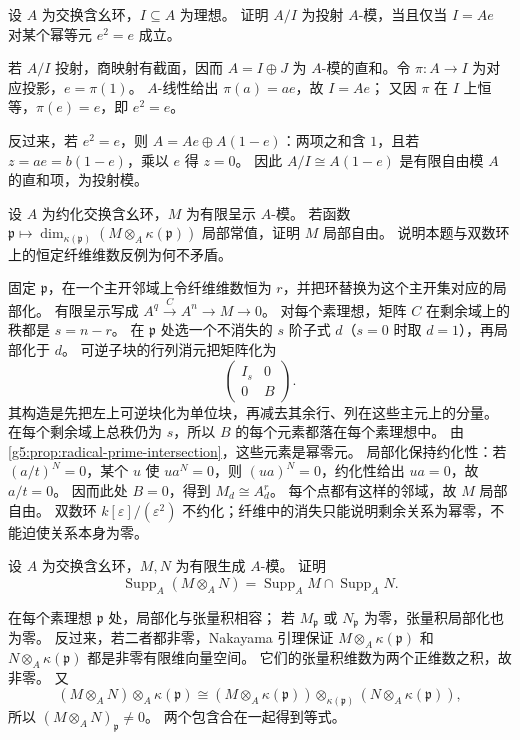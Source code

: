 \begin{exercise}\label{g5:ex:projective-cyclic-idempotent}
	设 \(A\) 为交换含幺环，\(I\subseteq A\) 为理想。 证明 \(A/I\) 为投射 \(A\)-模，当且仅当 \(I=Ae\) 对某个幂等元 \(e^2=e\) 成立。
\end{exercise}
\begin{solution}
	若 \(A/I\) 投射，商映射有截面，因而 \(A=I\oplus J\) 为 \(A\)-模的直和。令 \(\pi:A\to I\) 为对应投影，\(e=\pi(1)\)。 \(A\)-线性给出 \(\pi(a)=ae\)，故 \(I=Ae\)； 又因 \(\pi\) 在 \(I\) 上恒等，\(\pi(e)=e\)，即 \(e^2=e\)。

	反过来，若 \(e^2=e\)，则 \(A=Ae\oplus A(1-e)\)：两项之和含 \(1\)，且若 \(z=ae=b(1-e)\)，乘以 \(e\) 得 \(z=0\)。 因此 \(A/I\cong A(1-e)\) 是有限自由模 \(A\) 的直和项，为投射模。
\end{solution}

\begin{exercise}\label{g5:ex:reduced-constant-fibre}
	设 \(A\) 为约化交换含幺环，\(M\) 为有限呈示 \(A\)-模。 若函数 \(\mathfrak p\mapsto\dim_{\kappa(\mathfrak p)} (M\otimes_A\kappa(\mathfrak p))\) 局部常值，证明 \(M\) 局部自由。 说明本题与双数环上的恒定纤维维数反例为何不矛盾。
\end{exercise}
\begin{solution}
	固定 \(\mathfrak p\)，在一个主开邻域上令纤维维数恒为 \(r\)，并把环替换为这个主开集对应的局部化。 有限呈示写成 \(A^q\xrightarrow C A^n\to M\to0\)。 对每个素理想，矩阵 \(C\) 在剩余域上的秩都是 \(s=n-r\)。 在 \(\mathfrak p\) 处选一个不消失的 \(s\) 阶子式 \(d\)（\(s=0\) 时取 \(d=1\)），再局部化于 \(d\)。 可逆子块的行列消元把矩阵化为
	\[
	\begin{pmatrix}I_s&0\\0&B\end{pmatrix}.
	\]
	其构造是先把左上可逆块化为单位块，再减去其余行、列在这些主元上的分量。 在每个剩余域上总秩仍为 \(s\)，所以 \(B\) 的每个元素都落在每个素理想中。 由\cref{g5:prop:radical-prime-intersection}，这些元素是幂零元。 局部化保持约化性：若 \((a/t)^N=0\)，某个 \(u\) 使 \(ua^N=0\)，则 \((ua)^N=0\)，约化性给出 \(ua=0\)，故 \(a/t=0\)。 因而此处 \(B=0\)，得到 \(M_d\cong A_d^r\)。 每个点都有这样的邻域，故 \(M\) 局部自由。 双数环 \(k[\varepsilon]/(\varepsilon^2)\) 不约化；纤维中的消失只能说明剩余关系为幂零，不能迫使关系本身为零。
\end{solution}

\begin{exercise}\label{g5:ex:tensor-support-intersection}
	设 \(A\) 为交换含幺环，\(M,N\) 为有限生成 \(A\)-模。 证明
	\[
	\operatorname{Supp}_A(M\otimes_A N)
	=\operatorname{Supp}_A M\cap\operatorname{Supp}_A N.
	\]
\end{exercise}
\begin{solution}
	在每个素理想 \(\mathfrak p\) 处，局部化与张量积相容； 若 \(M_{\mathfrak p}\) 或 \(N_{\mathfrak p}\) 为零，张量积局部化也为零。 反过来，若二者都非零，Nakayama 引理保证 \(M\otimes_A\kappa(\mathfrak p)\) 和 \(N\otimes_A\kappa(\mathfrak p)\) 都是非零有限维向量空间。 它们的张量积维数为两个正维数之积，故非零。 又
	\[
	(M\otimes_A N)\otimes_A\kappa(\mathfrak p)
	\cong
	(M\otimes_A\kappa(\mathfrak p))
	\otimes_{\kappa(\mathfrak p)}
	(N\otimes_A\kappa(\mathfrak p)),
	\]
	所以 \((M\otimes_A N)_{\mathfrak p}\ne0\)。 两个包含合在一起得到等式。
\end{solution}
